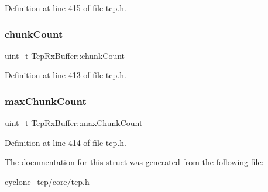 Definition at line 415 of file tcp.\+h.

\mbox{\label{structTcpRxBuffer_a2b1ee76f3c6f430cfa5544673dd0085c}} 
\subsubsection{\texorpdfstring{chunk\+Count}{chunkCount}}
{\footnotesize\ttfamily \hyperlink{compiler__port_8h_a12a1e9b3ce141648783a82445d02b58d}{uint\+\_\+t} Tcp\+Rx\+Buffer\+::chunk\+Count}



Definition at line 413 of file tcp.\+h.

\mbox{\label{structTcpRxBuffer_a8d1adc51c070bd980aa98042c80af04e}} 
\subsubsection{\texorpdfstring{max\+Chunk\+Count}{maxChunkCount}}
{\footnotesize\ttfamily \hyperlink{compiler__port_8h_a12a1e9b3ce141648783a82445d02b58d}{uint\+\_\+t} Tcp\+Rx\+Buffer\+::max\+Chunk\+Count}



Definition at line 414 of file tcp.\+h.



The documentation for this struct was generated from the following file\+:\begin{DoxyCompactItemize}
\item 
cyclone\+\_\+tcp/core/\hyperlink{tcp_8h}{tcp.\+h}\end{DoxyCompactItemize}
